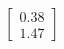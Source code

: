 \documentclass[preview]{standalone}
\begin{document}
\begin{align*}
\begin{bmatrix} 0.38 \\ 1.47 \end{bmatrix}
\end{align*}
\end{document}
